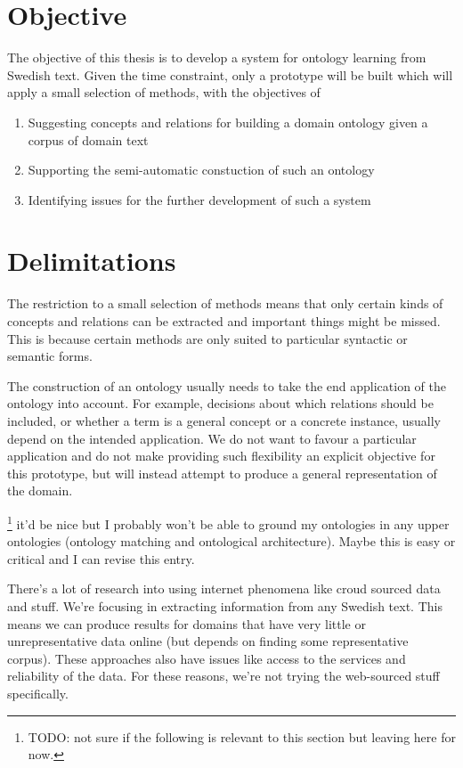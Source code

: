 \documentclass[a4paper]{report}
\newcommand{\todo}[1]{\footnote{{\color{red} TODO: #1}}}
\begin{document}
\section{Objective}
\label{sec:intro:objective}

The objective of this thesis is to develop a system for ontology learning from Swedish text.
Given the time constraint, only a prototype will be built which will apply a small selection of methods, with the objectives of
\begin{enumerate}
  \item Suggesting concepts and relations for building a domain ontology given a corpus of domain text
  \item Supporting the semi-automatic constuction of such an ontology
  \item Identifying issues for the further development of such a system
\end{enumerate}

\section{Delimitations}
\label{sec:intro:delimitations}

The restriction to a small selection of methods means that only certain kinds of concepts and relations can be extracted and important things might be missed.
This is because certain methods are only suited to particular syntactic or semantic forms.

The construction of an ontology usually needs to take the end application of the ontology into account.
For example, decisions about which relations should be included, or whether a term is a general concept or a concrete instance, usually depend on the intended application.
We do not want to favour a particular application and do not make providing such flexibility an explicit objective for this prototype, but will instead attempt to produce a general representation of the domain.

\todo{not sure if the following is relevant to this section but leaving here for now.}
it'd be nice but I probably won't be able to ground my ontologies in any upper ontologies (ontology matching and ontological architecture).
Maybe this is easy or critical and I can revise this entry.

There's a lot of research into using internet phenomena like croud sourced data and stuff.
We're focusing in extracting information from any Swedish text.
This means we can produce results for domains that have very little or unrepresentative data online (but depends on finding some representative corpus).
These approaches also have issues like access to the services and reliability of the data.
For these reasons, we're not trying the web-sourced stuff specifically.
\end{document}
